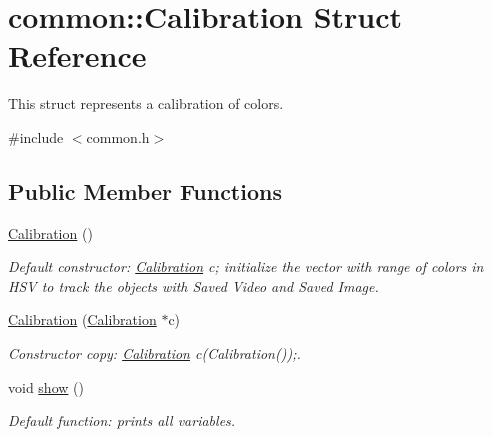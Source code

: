 \hypertarget{structcommon_1_1Calibration}{}\section{common\+:\+:Calibration Struct Reference}
\label{structcommon_1_1Calibration}


This struct represents a calibration of colors.  




{\ttfamily \#include $<$common.\+h$>$}

\subsection*{Public Member Functions}
\begin{DoxyCompactItemize}
\item 
\hyperlink{structcommon_1_1Calibration_a5c5c85c1e1ff7b5f1e5272deb8bf04b2}{Calibration} ()\hypertarget{structcommon_1_1Calibration_a5c5c85c1e1ff7b5f1e5272deb8bf04b2}{}\label{structcommon_1_1Calibration_a5c5c85c1e1ff7b5f1e5272deb8bf04b2}

\begin{DoxyCompactList}\small\item\em Default constructor\+: \hyperlink{structcommon_1_1Calibration}{Calibration} c; initialize the vector with range of colors in H\+SV to track the objects with Saved Video and Saved Image. \end{DoxyCompactList}\item 
\hyperlink{structcommon_1_1Calibration_a4c79aae796dd932808e8e009643164d7}{Calibration} (\hyperlink{structcommon_1_1Calibration}{Calibration} $\ast$c)\hypertarget{structcommon_1_1Calibration_a4c79aae796dd932808e8e009643164d7}{}\label{structcommon_1_1Calibration_a4c79aae796dd932808e8e009643164d7}

\begin{DoxyCompactList}\small\item\em Constructor copy\+: \hyperlink{structcommon_1_1Calibration}{Calibration} c(\+Calibration());. \end{DoxyCompactList}\item 
void \hyperlink{structcommon_1_1Calibration_aaec2830170bbb7dbce05c9e3139549a6}{show} ()\hypertarget{structcommon_1_1Calibration_aaec2830170bbb7dbce05c9e3139549a6}{}\label{structcommon_1_1Calibration_aaec2830170bbb7dbce05c9e3139549a6}

\begin{DoxyCompactList}\small\item\em Default function\+: prints all variables. \end{DoxyCompactList}\end{DoxyCompactItemize}
